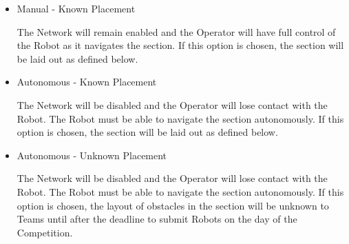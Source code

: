 \begin{itemize}
    \item Manual - Known Placement
    
        The Network will remain enabled and the Operator will have full control of the Robot as it navigates the section. If this option is chosen, the section will be laid out as defined below.
    \item Autonomous - Known Placement
    
        The Network will be disabled and the Operator will lose contact with the Robot. The Robot must be able to navigate the section autonomously. If this option is chosen, the section will be laid out as defined below.
    \item Autonomous - Unknown Placement
    
        The Network will be disabled and the Operator will lose contact with the Robot. The Robot must be able to navigate the section autonomously. If this option is chosen, the layout of obstacles in the section will be unknown to Teams until after the deadline to submit Robots on the day of the Competition. 
        
\end{itemize}